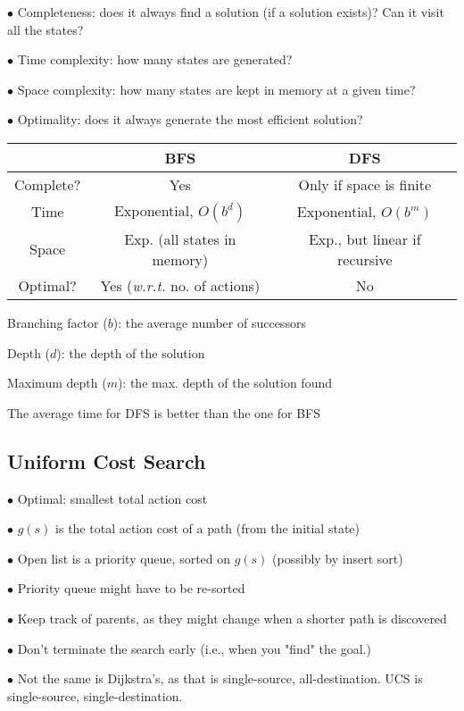 \documentclass[english,openany]{book}
\begin{document}
    $\bullet$ Completeness: does it always find a solution (if a solution exists)? Can it visit all the states?

    $\bullet$ Time complexity: how many states are generated?

    $\bullet$ Space complexity: how many states are kept in memory at a given time?

    $\bullet$ Optimality: does it always generate the most efficient solution?\\

    \begin{tabular}{|c|c|c|}
        \hline
        & BFS & DFS  \\
        \hline
        Complete? & Yes & Only if space is finite \\
        Time & Exponential, $O(b^d)$& Exponential, $O(b^m)$\\
        Space & Exp. (all states in memory) & Exp., but linear if recursive\\
        Optimal? & Yes (\textit{w.r.t.} no. of actions) & No\\
        \hline
    \end{tabular}

    Branching factor ($b$): the average number of successors

    Depth ($d$): the depth of the solution

    Maximum depth ($m$): the max. depth of the solution found

    The average time for DFS is better than the one for BFS

    \subsection{Uniform Cost Search}

    $\bullet$ Optimal: smallest total action cost

    $\bullet$ $g(s)$ is the total action cost of a path (from the initial state)

    $\bullet$ Open list is a priority queue, sorted on $g(s)$ (possibly by insert sort)

    $\bullet$ Priority queue might have to be re-sorted

    $\bullet$ Keep track of parents, as they might change when  a shorter path is discovered

    $\bullet$ Don't terminate the search early (i.e., when you "find" the goal.)

    $\bullet$ Not the same is Dijkstra's, as that is single-source, all-destination. UCS is single-source, single-destination.\\
\end{document}
